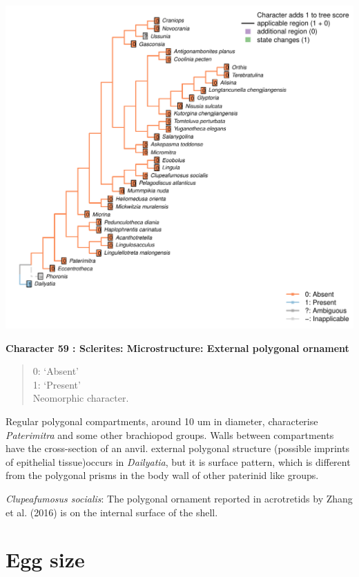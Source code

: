 \documentclass[]{book}
\theoremstyle{definition}
\theoremstyle{definition}
\theoremstyle{definition}
\theoremstyle{remark}
\begin{document}
\includegraphics{Brachiopod_phylogeny_files/figure-latex/unnamed-chunk-5-59.pdf}

\textbf{Character 59 : Sclerites: Microstructure: External polygonal
ornament }

\begin{quote}
0: `Absent'\\
1: `Present'\\
Neomorphic character.
\end{quote}

Regular polygonal compartments, around 10 um in diameter, characterise
\emph{Paterimitra} and some other brachiopod groups. Walls between
compartments have the cross-section of an anvil. external polygonal
structure (possible imprints of epithelial tissue)occurs in
\emph{Dailyatia}, but it is surface pattern, which is different from the
polygonal prisms in the body wall of other paterinid like groups.

\emph{Clupeafumosus socialis}: The polygonal ornament reported in
acrotretids by Zhang et al. (2016) is on the internal surface of the
shell.

\hypertarget{egg-size}{%
\section*{Egg size}\label{egg-size}}
\end{document}
